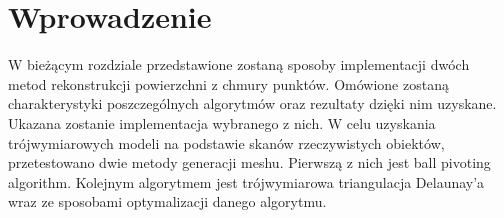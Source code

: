 \section{Wprowadzenie}
W bieżącym rozdziale przedstawione zostaną sposoby implementacji dwóch metod rekonstrukcji powierzchni z chmury punktów. Omówione zostaną charakterystyki poszczególnych algorytmów oraz rezultaty dzięki nim uzyskane. Ukazana zostanie implementacja wybranego z nich.
W celu uzyskania trójwymiarowych modeli na podstawie skanów rzeczywistych obiektów, przetestowano dwie metody generacji meshu. Pierwszą z nich jest ball pivoting algorithm. Kolejnym algorytmem jest trójwymiarowa triangulacja Delaunay'a wraz ze sposobami optymalizacji danego algorytmu.

